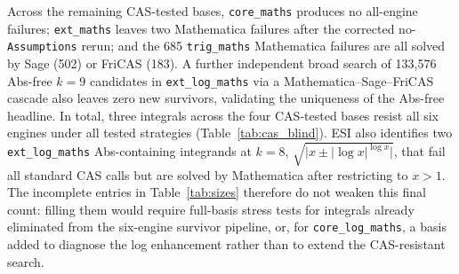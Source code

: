 \documentclass[preprint,12pt,authoryear]{elsarticle}
\newcommand{\codexadd}[1]{{\color{purple}#1}}
\newcommand{\hd}[1]{{\color{red}\textbf{[HD: #1]}}}
\begin{document}
\codexadd{Across the remaining CAS-tested bases, \texttt{core\_maths} produces no all-engine failures; \texttt{ext\_maths} leaves two Mathematica failures after the corrected no-\texttt{Assumptions} rerun; and the 685 \texttt{trig\_maths} Mathematica failures are all solved by Sage (502) or FriCAS (183). A further independent broad search of 133{,}576 Abs-free $k=9$ candidates in \texttt{ext\_log\_maths} via a Mathematica--Sage--FriCAS cascade also leaves zero new survivors, validating the uniqueness of the Abs-free headline. In total, three integrals across the four CAS-tested bases resist all six engines under all tested strategies (Table~\ref{tab:cas_blind}). ESI also identifies two \texttt{ext\_log\_maths} Abs-containing integrands at $k=8$, $\sqrt{\lvert x \pm \lvert\!\log x\rvert^{\log x}\rvert}$, that fail all standard CAS calls but are solved by Mathematica after restricting to $x>1$.}
\codexadd{The incomplete entries in Table~\ref{tab:sizes} therefore do not weaken this final count: filling them would require full-basis stress tests for integrals already eliminated from the six-engine survivor pipeline, or, for \texttt{core\_log\_maths}, a basis added to diagnose the log enhancement rather than to extend the CAS-resistant search.}
\end{document}
